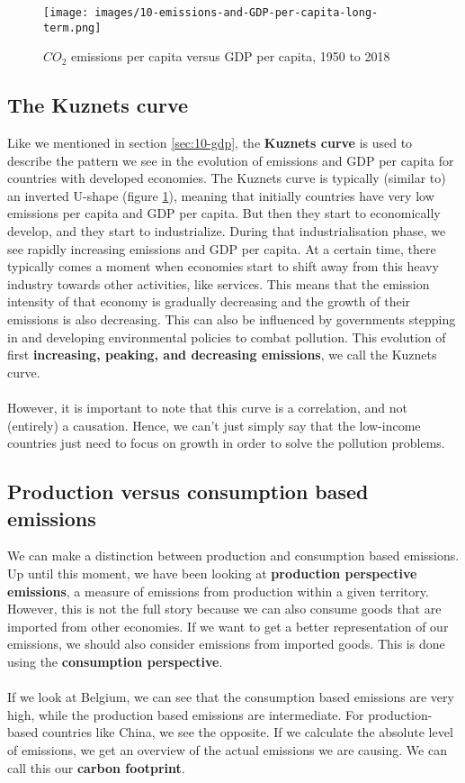 \documentclass[../summary.tex]{subfiles}
\begin{document}
	\begin{figure}[htbp]
		\centering
		\texttt{[image: images/10-emissions-and-GDP-per-capita-long-term.png]}
		\caption{$CO_{2}$ emissions per capita versus GDP per capita, 1950 to 2018}
		\label{fig:emissions-and-GDP-per-capita-long-term}
	\end{figure}

	\subsection{The Kuznets curve}
	
	 Like we mentioned in section \ref{sec:10-gdp}, the \textbf{Kuznets curve} is used to describe the pattern we see in the evolution of emissions and GDP per capita for countries with developed economies. The Kuznets curve is typically (similar to) an inverted U-shape (figure \ref{fig:emissions-and-GDP-per-capita-long-term}), meaning that initially countries have very low emissions per capita and GDP per capita. But then they start to economically develop, and they start to industrialize. During that industrialisation phase, we see rapidly increasing emissions and GDP per capita. At a certain time, there typically comes a moment when economies start to shift away from this heavy industry towards other activities, like services. This means that the emission intensity of that economy is gradually decreasing and the growth of their emissions is also decreasing. This can also be influenced by governments stepping in and developing environmental policies to combat pollution. This evolution of first \textbf{increasing, peaking, and decreasing emissions}, we call the Kuznets curve. 
	 \\\\
	 However, it is important to note that this curve is a correlation, and not (entirely) a causation. Hence, we can't just simply say that the low-income countries just need to focus on growth in order to solve the pollution problems.
	 \newpage
	\subsection{Production versus consumption based emissions}
	
	We can make a distinction between production and consumption based emissions. Up until this moment, we have been looking at \textbf{production perspective emissions}, a measure of emissions from production within a given territory. However, this is not the full story because we can also consume goods that are imported from other economies. If we want to get a better representation of our emissions, we should also consider emissions from imported goods. This is done using the \textbf{consumption perspective}.
	\\\\
	If we look at Belgium, we can see that the consumption based emissions are very high, while the production based emissions are intermediate. For production-based countries like China, we see the opposite. If we calculate the absolute level of emissions, we get an overview of the actual emissions we are causing. We can call this our \textbf{carbon footprint}.
	
\end{document}

